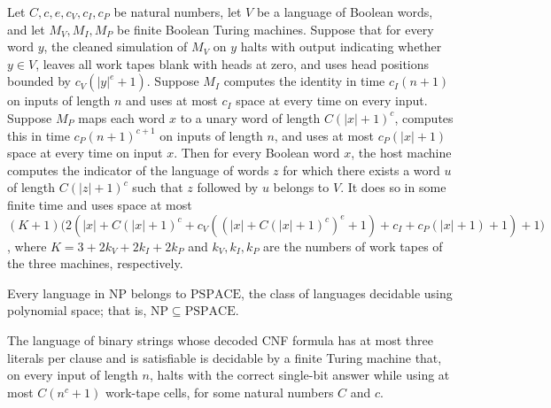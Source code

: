 \begin{theorem}
\label{Complexity.b2b_host_contract}
\leanok
{}
Let $C,c,e,c_V,c_I,c_P$ be natural numbers, let $V$ be a language of Boolean words, and
let $M_V,M_I,M_P$ be finite Boolean Turing machines. Suppose that for every word $y$,
the cleaned simulation of $M_V$ on $y$ halts with output indicating whether $y\in V$,
leaves all work tapes blank with heads at zero, and uses head positions bounded by
$c_V(|y|^e+1)$. Suppose $M_I$ computes the identity in time $c_I(n+1)$ on inputs of
length $n$ and uses at most $c_I$ space at every time on every input. Suppose $M_P$ maps
each word $x$ to a unary word of length $C(|x|+1)^c$, computes this in time
$c_P(n+1)^{c+1}$ on inputs of length $n$, and uses at most $c_P(|x|+1)$ space at every
time on input $x$. Then for every Boolean word $x$, the host machine computes the
indicator of the language of words $z$ for which there exists a word $u$ of length
$C(|z|+1)^c$ such that $z$ followed by $u$ belongs to $V$. It does so in some finite
time and uses space at most
$(K+1)\bigl(2(|x|+C(|x|+1)^c+c_V((|x|+C(|x|+1)^c)^e+1)+c_I+c_P(|x|+1)+1)+1\bigr)$, where
$K=3+2k_V+2k_I+2k_P$ and $k_V,k_I,k_P$ are the numbers of work tapes of the three
machines, respectively.
\end{theorem}

\begin{theorem}
\label{Complexity.NP_subset_PSPACE}
\leanok
{}
Every language in $\mathrm{NP}$ belongs to $\mathrm{PSPACE}$, the class of languages
decidable using polynomial space; that is, $\mathrm{NP}\subseteq\mathrm{PSPACE}$.
\end{theorem}

\begin{theorem}
\label{Complexity.SAT3_mem_PSPACE}
\leanok
{}
The language of binary strings whose decoded CNF formula has at most three literals per
clause and is satisfiable is decidable by a finite Turing machine that, on every input
of length $n$, halts with the correct single-bit answer while using at most $C(n^c+1)$
work-tape cells, for some natural numbers $C$ and $c$.
\end{theorem}
